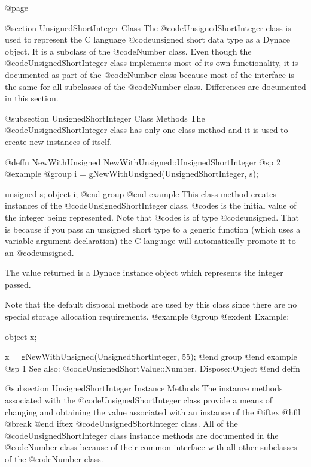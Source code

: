 @page

@section UnsignedShortInteger Class
The @code{UnsignedShortInteger} class is used to represent the C language
@code{unsigned short} data type as a Dynace object.  It is a subclass of the
@code{Number} class.  Even though the @code{UnsignedShortInteger} class
implements most of its own functionality, it is documented as part of
the @code{Number} class because most of the interface is the same for
all subclasses of the @code{Number} class.  Differences are documented
in this section.


@subsection UnsignedShortInteger Class Methods
The @code{UnsignedShortInteger} class has only one class method and it
is used to create new instances of itself.



@deffn {NewWithUnsigned} NewWithUnsigned::UnsignedShortInteger
@sp 2
@example
@group
i = gNewWithUnsigned(UnsignedShortInteger, s);

unsigned s;
object  i;
@end group
@end example
This class method creates instances of the @code{UnsignedShortInteger}
class.  @code{s} is the initial value of the integer being represented.
Note that @code{s} is of type @code{unsigned}.  That is because if you
pass an unsigned short type to a generic function (which uses a variable
argument declaration) the C language will automatically promote it to an
@code{unsigned}.

The value returned is a Dynace instance object which represents the
integer passed.

Note that the default disposal methods are used by this class since
there are no special storage allocation requirements.
@example
@group
@exdent Example:

object  x;

x = gNewWithUnsigned(UnsignedShortInteger, 55);
@end group
@end example
@sp 1
See also:  @code{UnsignedShortValue::Number, Dispose::Object}
@end deffn





@subsection UnsignedShortInteger Instance Methods
The instance methods associated with the @code{UnsignedShortInteger}
class provide a means of changing and obtaining the value associated
with an instance of the 
@iftex
@hfil @break 
@end iftex
@code{UnsignedShortInteger} class.
All of the @code{UnsignedShortInteger} class instance methods are
documented in the @code{Number} class because of their common interface
with all other subclasses of the @code{Number} class.

















